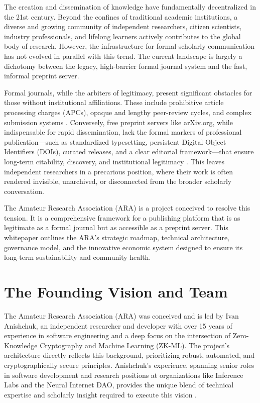 \documentclass[conference, compsoc, 11pt]{IEEEtran}
\begin{document}
The creation and dissemination of knowledge have fundamentally decentralized in the 21st century. Beyond the confines of traditional academic institutions, a diverse and growing community of independent researchers, citizen scientists, industry professionals, and lifelong learners actively contributes to the global body of research. However, the infrastructure for formal scholarly communication has not evolved in parallel with this trend. The current landscape is largely a dichotomy between the legacy, high-barrier formal journal system and the fast, informal preprint server.

Formal journals, while the arbiters of legitimacy, present significant obstacles for those without institutional affiliations. These include prohibitive article processing charges (APCs), opaque and lengthy peer-review cycles, and complex submission systems \cite{eve2017}. Conversely, free preprint servers like arXiv.org, while indispensable for rapid dissemination, lack the formal markers of professional publication—such as standardized typesetting, persistent Digital Object Identifiers (DOIs), curated releases, and a clear editorial framework—that ensure long-term citability, discovery, and institutional legitimacy \cite{ginsparg2011}. This leaves independent researchers in a precarious position, where their work is often rendered invisible, unarchived, or disconnected from the broader scholarly conversation.

The Amateur Research Association (ARA) is a project conceived to resolve this tension. It is a comprehensive framework for a publishing platform that is as legitimate as a formal journal but as accessible as a preprint server. This whitepaper outlines the ARA’s strategic roadmap, technical architecture, governance model, and the innovative economic system designed to ensure its long-term sustainability and community health.

\section{The Founding Vision and Team}

The Amateur Research Association (ARA) was conceived and is led by Ivan Anishchuk, an independent researcher and developer with over 15 years of experience in software engineering and a deep focus on the intersection of Zero-Knowledge Cryptography and Machine Learning (ZK-ML). The project's architecture directly reflects this background, prioritizing robust, automated, and cryptographically secure principles. Anishchuk's experience, spanning senior roles in software development and research positions at organizations like Inference Labs and the Neural Internet DAO, provides the unique blend of technical expertise and scholarly insight required to execute this vision \cite{anishchuk2025}.
\end{document}
